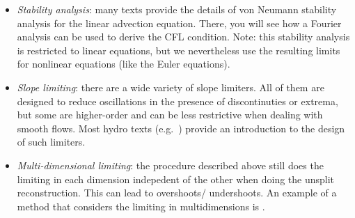 \documentclass[11pt]{article}
\begin{document}
\begin{itemize}
\item {\em Stability analysis}: many texts provide the details of von
  Neumann stability analysis for the linear advection equation.
  There, you will see how a Fourier analysis can be used to derive the
  CFL condition.  Note: this stability analysis is restricted to
  linear equations, but we nevertheless use the resulting limits for
  nonlinear equations (like the Euler equations).

\item {\em Slope limiting}: there are a wide variety of slope limiters.
  All of them are designed to reduce oscillations in the presence
  of discontinuties or extrema, but some are higher-order and can be
  less restrictive when dealing with smooth flows.  Most hydro
  texts (e.g.\ \cite{leveque:2002,toro:1997}) provide an introduction to the design
  of such limiters.

\item {\em Multi-dimensional limiting}: the procedure described above
  still does the limiting in each dimension indepedent of the other
  when doing the unsplit reconstruction.  This can lead to overshoots/
  undershoots.  An example of a method that considers the limiting
  in multidimensions is \cite{BDS,quadBDS}.

\end{itemize}




\end{document}
